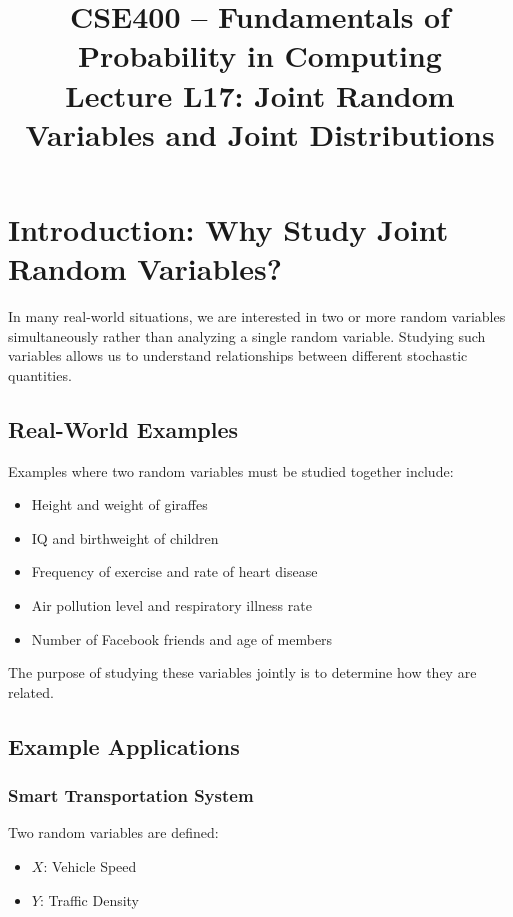 \documentclass{article}
\begin{document}
\title{CSE400 – Fundamentals of Probability in Computing\\
Lecture L17: Joint Random Variables and Joint Distributions}
\date{}
\maketitle

\section{Introduction: Why Study Joint Random Variables?}

In many real-world situations, we are interested in two or more random variables simultaneously rather than analyzing a single random variable. Studying such variables allows us to understand relationships between different stochastic quantities.

\subsection*{Real-World Examples}

Examples where two random variables must be studied together include:

\begin{itemize}
\item Height and weight of giraffes
\item IQ and birthweight of children
\item Frequency of exercise and rate of heart disease
\item Air pollution level and respiratory illness rate
\item Number of Facebook friends and age of members
\end{itemize}

The purpose of studying these variables jointly is to determine how they are related.

\subsection{Example Applications}

\subsubsection*{Smart Transportation System}

Two random variables are defined:

\begin{itemize}
\item $X$: Vehicle Speed
\item $Y$: Traffic Density
\end{itemize}
\end{document}
